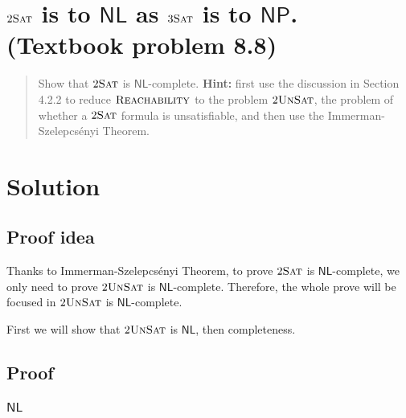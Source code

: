 
\newtheorem{theorem}{Theorem}

\maketitle
\thispagestyle{firststyle}
\vspace{-2.0cm}

\section{$2\textsc{Sat}$ is to $\mathsf{NL}$ as $3\textsc{Sat}$ is to $\mathsf{NP}$. (Textbook problem 8.8)}
\begin{quote}
    Show that $2\textsc{Sat}$ is $\mathsf{NL}$-complete.
    {\bf Hint:} first use the discussion in Section 4.2.2 to reduce
    $\textsc{Reachability}$ to the problem $2\textsc{UnSat}$,
    the problem of whether a $2\textsc{Sat}$ formula is unsatisfiable,
    and then use the Immerman-Szelepcs\'{e}nyi Theorem.
\end{quote}

\section*{Solution}

\subsection*{Proof idea}

Thanks to Immerman-Szelepcs\'{e}nyi Theorem, to prove $2\textsc{Sat}$ is $\mathsf{NL}$-complete, we only need to prove $2\textsc{UnSat}$ is $\mathsf{NL}$-complete.
Therefore, the whole prove will be focused in $2\textsc{UnSat}$ is $\mathsf{NL}$-complete.

First we will show that $2\textsc{UnSat}$ is $\mathsf{NL}$, then completeness.

\subsection*{Proof}

\subsubsection*{$\mathsf{NL}$}

